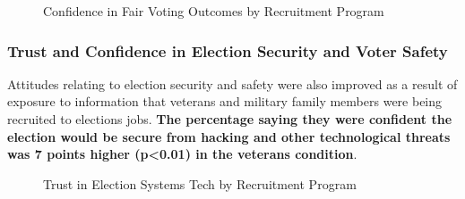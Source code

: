 \documentclass[
  11pt,
  a4paper,
]{article}
\begin{document}
\begin{figure}

\caption{\label{fig-q23-likert}Confidence in Fair Voting Outcomes by
Recruitment Program}


\end{figure}%

\subsubsection{Trust and Confidence in Election Security and Voter
Safety}\label{trust-and-confidence-in-election-security-and-voter-safety}

Attitudes relating to election security and safety were also improved as
a result of exposure to information that veterans and military family
members were being recruited to elections jobs. \textbf{The percentage
saying they were confident the election would be secure from hacking and
other technological threats was 7 points higher (p\textless0.01) in the
veterans condition}.

\begin{figure}

\caption{\label{fig-q24-likert}Trust in Election Systems Tech by
Recruitment Program}


\end{figure}%
\end{document}
